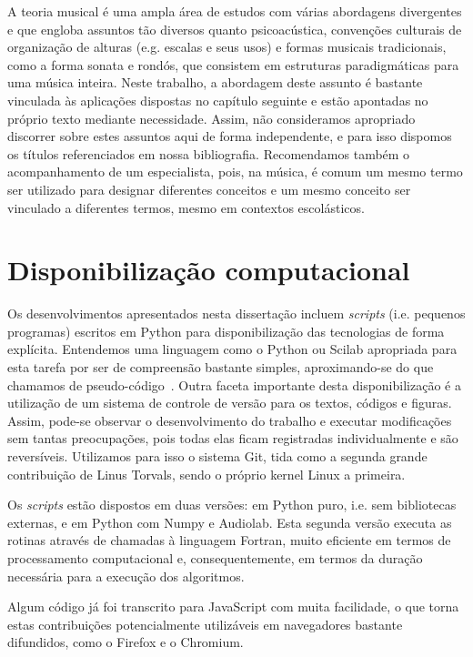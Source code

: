 A teoria musical é uma ampla área de estudos com várias abordagens divergentes e que engloba assuntos tão diversos quanto psicoacústica, convenções culturais de organização de alturas (e.g. escalas e seus usos) e formas musicais tradicionais, como a forma sonata e rondós, que consistem em estruturas paradigmáticas para uma música inteira. Neste trabalho, a abordagem deste assunto é bastante vinculada às aplicações dispostas no capítulo seguinte e estão apontadas no próprio texto mediante necessidade. Assim, não consideramos apropriado discorrer sobre estes assuntos aqui de forma independente, e para isso dispomos os títulos referenciados em nossa bibliografia. Recomendamos também o acompanhamento de um especialista, pois, na música, é comum um mesmo termo ser utilizado para designar diferentes conceitos e um mesmo conceito ser vinculado a diferentes termos, mesmo em contextos escolásticos.


    \section{Disponibilização computacional}
Os desenvolvimentos apresentados nesta dissertação incluem \emph{scripts} (i.e. pequenos programas) escritos em Python para disponibilização das tecnologias de forma explícita. Entendemos uma linguagem como o Python ou Scilab apropriada para esta tarefa
por ser de compreensão bastante simples, aproximando-se do que chamamos de pseudo-código~\cite{tutPython}. Outra faceta importante desta disponibilização é a utilização de um sistema de controle de versão para os textos, códigos e figuras. Assim, pode-se observar o desenvolvimento do trabalho e executar modificações sem tantas preocupações, pois todas elas ficam registradas individualmente e são reversíveis. Utilizamos para isso o sistema Git, tida como a segunda grande contribuição de Linus Torvals, sendo o próprio kernel Linux a primeira.

Os \emph{scripts} estão dispostos em duas versões: em Python puro, i.e. sem bibliotecas externas, e em Python com Numpy e Audiolab. Esta segunda versão executa as rotinas através de chamadas à linguagem Fortran, muito eficiente em termos de processamento computacional e, consequentemente, em termos da duração necessária para a execução dos algoritmos.

Algum código já foi transcrito para JavaScript com muita facilidade, o que torna estas contribuições potencialmente utilizáveis em navegadores bastante difundidos, como o Firefox e o Chromium.

